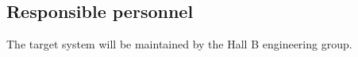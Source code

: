 
\subsection{Responsible personnel}
The target system will be maintained by the Hall B engineering group.





